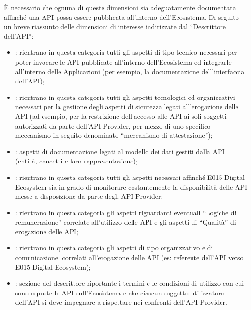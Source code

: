 \documentclass[letterpaper,10pt,italian]{sphinxmanual}
\begin{document}
È necessario che ognuna di queste dimensioni sia adeguatamente documentata affinché una API possa essere pubblicata all’interno dell’Ecosistema.
Di seguito un breve riassunto delle dimensioni di interesse indirizzate dal “Descrittore dell’API”:
\begin{itemize}
\item {} 
: rientrano in questa categoria tutti gli aspetti di tipo tecnico necessari per poter invocare le API pubblicate all’interno dell’Ecosistema ed integrarle all’interno delle Applicazioni (per esempio, la documentazione dell’interfaccia dell’API);

\item {} 
: rientrano in questa categoria tutti gli aspetti tecnologici ed organizzativi necessari per la gestione degli aspetti di sicurezza legati all’erogazione delle API (ad esempio, per la restrizione dell’accesso alle API ai soli soggetti autorizzati da parte dell’API Provider, per mezzo di uno specifico meccanismo in seguito denominato “meccanismo di attestazione”);

\item {} 
: aspetti di documentazione legati al modello dei dati gestiti dalla API (entità, concetti e loro rappresentazione);

\item {} 
: rientrano in questa categoria tutti gli aspetti necessari affinché E015 Digital Ecosystem sia in grado di monitorare costantemente la disponibilità delle API messe a disposizione da parte degli API Provider;

\item {} 
: rientrano in questa categoria gli aspetti riguardanti eventuali “Logiche di remunerazione” correlate all’utilizzo delle API e gli aspetti di “Qualità” di erogazione delle API;

\item {} 
: rientrano in questa categoria gli aspetti di tipo organizzativo e di comunicazione, correlati all’erogazione delle API (es: referente dell’API verso E015 Digital Ecosystem);

\item {} 
: sezione del descrittore riportante i termini e le condizioni di utilizzo con cui sono esposte le API sull’Ecosistema e che ciascun soggetto utilizzatore dell’API si deve impegnare a rispettare nei confronti dell’API Provider.

\end{itemize}
\end{document}

